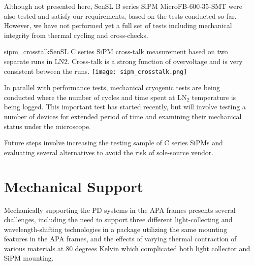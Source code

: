 Although not presented here, SenSL B series SiPM MicroFB-600-35-SMT
were also tested and satisfy our requirements, based on the tests
conducted so far. However, we have not performed yet a full set of
tests including mechanical integrity from thermal cycling and
cross-checks. 

\begin{cdrfigure}{sipm_crosstalk}{SenSL C series SiPM cross-talk measurement
    based on two separate runs in LN2. Cross-talk is a strong function
    of overvoltage and is very consistent between the runs.}       
  \texttt{[image: sipm\_crosstalk.png]}
\end{cdrfigure}

In parallel with performance tests, mechanical cryogenic tests are being
conducted where the number of cycles and time spent at LN$_2$ temperature
is being logged. This important test has started recently, but will
involve testing a number of devices for extended period of time and
examining their mechanical status under the microscope.%

Future steps involve increasing the testing sample of C series SiPMs
and evaluating several alternatives to avoid the risk of sole-source
vendor. 


\section{Mechanical Support}

Mechanically supporting the PD systems in the APA frames
presents several challenges, including the need to support three
different light-collecting and wavelength-shifting technologies in a
package utilizing the same mounting features in the APA frames, and
the effects of varying thermal contraction of various materials at 80
degrees Kelvin which complicated both light collector and SiPM
mounting. 

